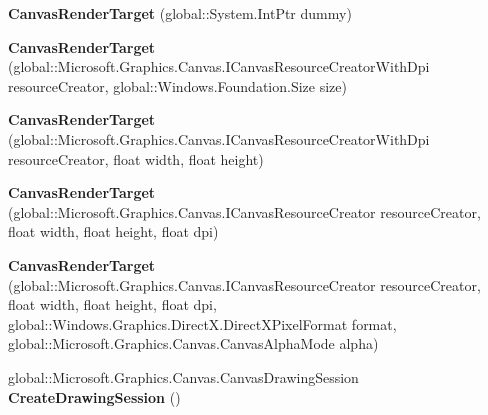 \begin{DoxyCompactItemize}
\mbox{\label{class_microsoft_1_1_graphics_1_1_canvas_1_1_canvas_render_target_a4669138bf9504f494fe1e580a173f219}} 
{\bfseries Canvas\+Render\+Target} (global\+::\+System.\+Int\+Ptr dummy)
\item 
\mbox{\label{class_microsoft_1_1_graphics_1_1_canvas_1_1_canvas_render_target_a6e7619cdae74a3f3f23f3ad70840e69c}} 
{\bfseries Canvas\+Render\+Target} (global\+::\+Microsoft.\+Graphics.\+Canvas.\+I\+Canvas\+Resource\+Creator\+With\+Dpi resource\+Creator, global\+::\+Windows.\+Foundation.\+Size size)
\item 
\mbox{\label{class_microsoft_1_1_graphics_1_1_canvas_1_1_canvas_render_target_a1ebbe6ada521c806eb64d35b3c9d1c23}} 
{\bfseries Canvas\+Render\+Target} (global\+::\+Microsoft.\+Graphics.\+Canvas.\+I\+Canvas\+Resource\+Creator\+With\+Dpi resource\+Creator, float width, float height)
\item 
\mbox{\label{class_microsoft_1_1_graphics_1_1_canvas_1_1_canvas_render_target_a397381500ed5d38d360913faaac5baac}} 
{\bfseries Canvas\+Render\+Target} (global\+::\+Microsoft.\+Graphics.\+Canvas.\+I\+Canvas\+Resource\+Creator resource\+Creator, float width, float height, float dpi)
\item 
\mbox{\label{class_microsoft_1_1_graphics_1_1_canvas_1_1_canvas_render_target_a69d75f14eb0e74873b4a8ffb803dec0f}} 
{\bfseries Canvas\+Render\+Target} (global\+::\+Microsoft.\+Graphics.\+Canvas.\+I\+Canvas\+Resource\+Creator resource\+Creator, float width, float height, float dpi, global\+::\+Windows.\+Graphics.\+Direct\+X.\+Direct\+X\+Pixel\+Format format, global\+::\+Microsoft.\+Graphics.\+Canvas.\+Canvas\+Alpha\+Mode alpha)
\item 
\mbox{\label{class_microsoft_1_1_graphics_1_1_canvas_1_1_canvas_render_target_a12a2480b49988d0269ab6b58cc3a8433}} 
global\+::\+Microsoft.\+Graphics.\+Canvas.\+Canvas\+Drawing\+Session {\bfseries Create\+Drawing\+Session} ()

\end{DoxyCompactItemize}
